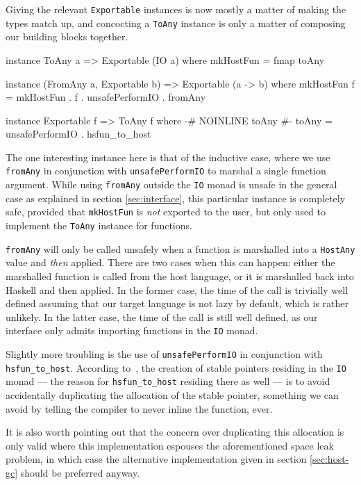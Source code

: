 \documentclass{sigplanconf}
\begin{document}
Giving the relevant \lstinline!Exportable! instances is now mostly a matter of
making the types match up, and concocting a \lstinline!ToAny! instance is only
a matter of composing our building blocks together.

\begin{code}
  instance ToAny a => Exportable (IO a) where
    mkHostFun = fmap toAny

  instance (FromAny a, Exportable b) =>
            Exportable (a -> b) where
    mkHostFun f =
      mkHostFun . f . unsafePerformIO . fromAny
  
  instance Exportable f => ToAny f where
    {-# NOINLINE toAny #-}
    toAny = unsafePerformIO . hsfun_to_host
\end{code}

The one interesting instance here is that of the inductive case, where we use
\lstinline!fromAny! in conjunction with \lstinline!unsafePerformIO! to marshal
a single function argument. While using \lstinline!fromAny! outside the
\lstinline!IO! monad is unsafe in the general case as explained in section
\ref{sec:interface}, this particular instance is completely safe, provided that
\lstinline!mkHostFun! is \emph{not} exported to the user, but only used to
implement the \lstinline!ToAny! instance for functions.

\lstinline!fromAny! will only be called unsafely when a function is marshalled
into a \lstinline!HostAny! value and \emph{then} applied. There are two cases
when this can happen: either the marshalled function is called from the host
language, or it is marshalled back into Haskell and then applied.
In the former case, the time of the call is trivially well defined assuming
that our target language is not lazy by default, which is rather unlikely.
In the latter case, the time of the call is still well defined, as our
interface only admits importing functions in the \lstinline!IO! monad.

Slightly more troubling is the use of \lstinline!unsafePerformIO! in
conjunction with \lstinline!hsfun_to_host!.
According to\ \cite{stableptr}, the creation of stable pointers residing in
the \lstinline!IO! monad --- the reason for \lstinline!hsfun_to_host! residing
there as well --- is to avoid accidentally duplicating the allocation of the
stable pointer, something we can avoid by telling the compiler to never
inline the function, ever.

It is also worth pointing out that the concern over duplicating this allocation
is only valid where this implementation espouses the aforementioned space leak
problem, in which case the alternative implementation given in section
\ref{sec:host-gc} should be preferred anyway.
\end{document}
